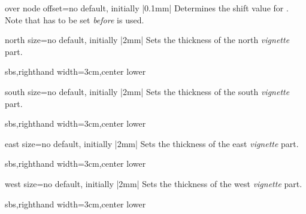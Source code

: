 \begin{vigTcbKey}[][doc new=2016-04-22]{over node offset}{=}{no default, initially |0.1mm|}
  Determines the shift value for .
  Note that  has to be set \emph{before}
   is used.
\end{vigTcbKey}


\begin{vigTcbKey}[][doc new=2016-04-22]{north size}{=}{no default, initially |2mm|}
  Sets the thickness of the north \emph{vignette} part.
\begin{dispExample*}{sbs,righthand width=3cm,center lower}
\end{dispExample*}
\end{vigTcbKey}

\begin{vigTcbKey}[][doc new=2016-04-22]{south size}{=}{no default, initially |2mm|}
  Sets the thickness of the south \emph{vignette} part.
\begin{dispExample*}{sbs,righthand width=3cm,center lower}
\end{dispExample*}
\end{vigTcbKey}

\begin{vigTcbKey}[][doc new=2016-04-22]{east size}{=}{no default, initially |2mm|}
  Sets the thickness of the east \emph{vignette} part.
\begin{dispExample*}{sbs,righthand width=3cm,center lower}
\end{dispExample*}
\end{vigTcbKey}

\begin{vigTcbKey}[][doc new=2016-04-22]{west size}{=}{no default, initially |2mm|}
  Sets the thickness of the west \emph{vignette} part.
\begin{dispExample*}{sbs,righthand width=3cm,center lower}
\end{dispExample*}
\end{vigTcbKey}

